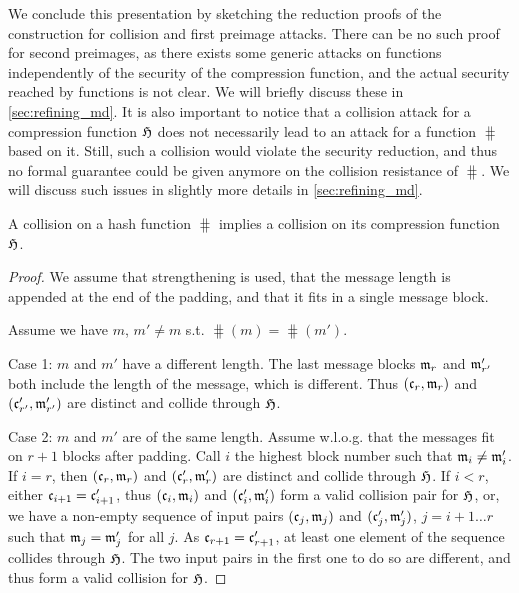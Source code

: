 We conclude this presentation by sketching the reduction proofs of the construction for collision and first preimage attacks. There can be no such proof
for second preimages, as there exists some generic attacks on \merkdam functions independently of the security of the compression function, and the actual
security reached by \merkdam functions is not clear. We will
briefly discuss these in \autoref{sec:refining_md}.
It is also important to notice that a collision attack for a compression function $\operatorname{\mathfrak{H}}$ does not necessarily lead
to an attack for a \merkdam function $\hash$ based on it. Still, such a collision would violate the security reduction, and thus no formal guarantee could be given
anymore on the collision resistance of $\hash$. We will discuss such issues in slightly more details in \autoref{sec:refining_md}.

\begin{prop}
A collision on a \merkdam hash function $\hash$ implies a collision on its compression function $\operatorname{\mathfrak{H}}$.\end{prop}
\begin{proof}
We assume
that \merkdam strengthening is used, that the message length is appended at the end of the padding, and that it fits in a single message block.

Assume we have $m$, $m' \neq m$ s.t. $\hash(m) = \hash(m')$.

Case 1: $m$ and $m'$ have a different length.
The last message blocks $\mathfrak{m}_r$ and $\mathfrak{m}'_{r'}$ both include the length
of the message, which is different. Thus $(\mathfrak{c}_r,\mathfrak{m}_r)$ and $(\mathfrak{c}'_{r'}, \mathfrak{m}'_{r'})$ are distinct and collide through $\operatorname{\mathfrak{H}}$.

Case 2: $m$ and $m'$ are of the same length. Assume w.l.o.g. that the messages fit on $r + 1$ blocks after padding.
Call $i$ the highest block number such that $\mathfrak{m}_{i} \neq \mathfrak{m}'_{i}$. If $i = r$, then $(\mathfrak{c}_r,\mathfrak{m}_r)$ and $(\mathfrak{c}'_{r}, \mathfrak{m}'_{r})$
are distinct and collide through $\operatorname{\mathfrak{H}}$. If $i < r$, either $\mathfrak{c}_{i+1} = \mathfrak{c}'_{i+1}$, thus $(\mathfrak{c}_i,\mathfrak{m}_i)$ and $(\mathfrak{c}'_{i}, \mathfrak{m}'_{i})$
form a valid collision pair for $\operatorname{\mathfrak{H}}$, or, we have a non-empty sequence of input pairs $(\mathfrak{c}_j, \mathfrak{m}_j)$ and $(\mathfrak{c}'_j, \mathfrak{m}'_j)$,
$j = i+1\ldots r$ such that $\mathfrak{m}_j = \mathfrak{m}'_j$ for all $j$. As $\mathfrak{c}_{r+1} = \mathfrak{c}'_{r+1}$, at least one element of the sequence
collides through $\operatorname{\mathfrak{H}}$. The two input pairs in the first one to do so are different, and thus form a valid collision for $\operatorname{\mathfrak{H}}$.
\end{proof}

